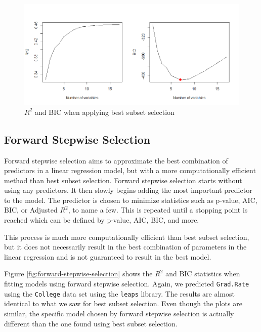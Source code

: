\documentclass{article}
\begin{document}
\begin{figure}[!h]
	\centering
	\caption{$R^2$ and BIC when applying best subset selection}
	\label{fig:best-subset-selection}
	\includegraphics[width = 6in]{images/best-subset-selection.png}
\end{figure}

\subsection{Forward Stepwise Selection}
Forward stepwise selection aims to approximate the best combination of predictors in a linear regression model, but with a more computationally efficient method than best subset selection. Forward stepwise selection starts without using any predictors. It then slowly begins adding the most important predictor to the model. The predictor is chosen to minimize statistics such as p-value, AIC, BIC, or Adjusted $R^2$, to name a few. This is repeated until a stopping point is reached which can be defined by p-value, AIC, BIC, and more.

This process is much more computationally efficient than best subset selection, but it does not necessarily result in the best combination of parameters in the linear regression and is not guaranteed to result in the best model.

Figure \ref{fig:forward-stepwise-selection} shows the $R^2$ and BIC statistics when fitting models using forward stepwise selection. Again, we predicted \lstinline!Grad.Rate! using the \lstinline!College! data set using the \lstinline!leaps! library. The results are almost identical to what we saw for best subset selection. Even though the plots are similar, the specific model chosen by forward stepwise selection is actually different than the one found using best subset selection.
\end{document}
